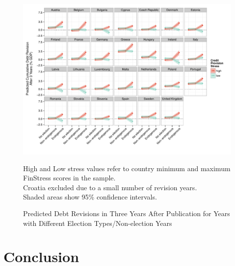 \documentclass[]{article}
\begin{document}
\begin{figure}
	\caption{Predicted Debt Revisions in Three Years After Publication for Years with Different Election Types/Non-election Years}
    \label{country_predict_debt_required}
    \begin{center}
    	\includegraphics[scale=0.7]{figures/country_predict_required.pdf}
    \end{center}

	{\scriptsize{High and Low stress values refer to country minimum and maximum FinStress scores in the sample.\\
    Croatia excluded due to a small number of revision years.\\
    Shaded areas show 95\% confidence intervals.
}}

\end{figure}


\section{Conclusion}


\clearpage



\end{document}
